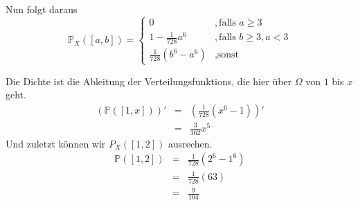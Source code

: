 \documentclass[11pt,a4paper,ngerman]{article}
\begin{document}
    Nun folgt daraus
\[
    \mathbb{P}_X([a,b]) = \left\{ 
    \begin{array}{lr}
        0 &,\text{falls }a\geq3\\
        1 - \frac{1}{728} a^6 &,\text{falls }b\geq 3, a<3\\
        \frac{1}{728}\left( b^6 - a^6\right)&, \text{sonst}
    \end{array}
    \right.
\]

    Die Dichte ist die Ableitung der Verteilungsfunktions, die hier über $\Omega$ von $1$ bis $x$ geht.
\[
   \begin{array}{rcl}
        (\mathbb{P}([1,x]))'    &=& \left( \frac{1}{728} \left( x^6 - 1\right) \right)'\\
                                &=& \frac{3}{362} x^5
    \end{array}
\]
    Und zuletzt können wir $P_X([1,2])$ ausrechen.
\[
    \begin{array}{rcl}
        \mathbb{P}([1,2])   &=& \frac{1}{728} (2^6 - 1^6)\\
                            &=& \frac{1}{728} (63)\\
                            &=& \frac{9}{104}
    \end{array}
\]
\label{LastPage}
\end{document}
